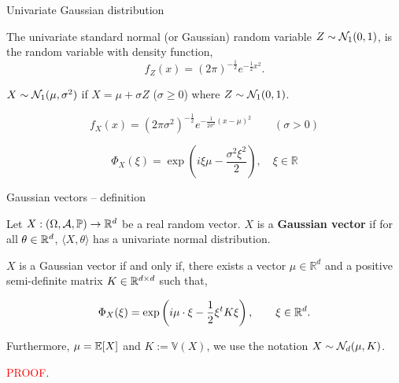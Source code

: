 \documentclass{beamer}
\begin{document}
  \begin{frame}{Univariate Gaussian distribution}

    The univariate standard normal (or Gaussian) random variable  $Z \sim
    \mathcal{N}_1(0,1)$, is the random variable with density function,
    $$f_Z(x)=(2\pi)^{-\frac{1}{2}} e^{-\frac{1}{2}x^{2}}.$$

    \pause

    $X \sim \mathcal{N}_1(\mu,\sigma^2)$ if $X = \mu + \sigma Z$
    ($\sigma \geq 0$) where  $Z \sim \mathcal{N}_1(0,1)$.

    $$f_X(x)=(2
    \pi\sigma^2)^{-\frac{1}{2}} e^{-\frac{1}{2\sigma^2}(x-\mu)^{2}} \qquad
    (\sigma > 0) $$

    \pause

      $$
      \Phi_{X}(\xi)=\exp \left(i\xi \mu -\frac{\sigma^{2} \xi^{2}}{2}\right), \quad \xi \in \mathbb{R}
      $$
  \end{frame}

  \begin{frame}{Gaussian vectors -- definition}
    \begin{definition}
      Let $X:(\Omega,\mathcal{A},\mathbb{P}) \to \mathbb{R}^{d}$ be a real random vector. $X$ is a \textbf{Gaussian
        vector} if for all $\theta \in \mathbb{R}^{d}$, $\langle X, \theta \rangle$ has a
      univariate normal distribution.
    \end{definition}

    \pause

    \begin{theorem} $X$ is a Gaussian vector if and only if, there exists a
      vector $\mu \in \mathbb{R}^{d}$ and a positive semi-definite matrix $K \in \mathbb{R}^{d \times d}$ such that,

      \begin{equation}
        \Phi_{X}(\xi)=\exp \left(i \mu \cdot \xi-\frac{1}{2} \xi^t K \xi\right),
        \qquad \xi \in \mathbb{R}^{d}.
      \end{equation}

      Furthermore, $\mu = \mathbb{E}[X]$ and $K := \mathbb{V}(X)$, we use the notation
      $X \sim \mathcal{N}_d(\mu,K)$.
    \end{theorem}

    \textcolor{red}{PROOF}.
  \end{frame}
\end{document}
